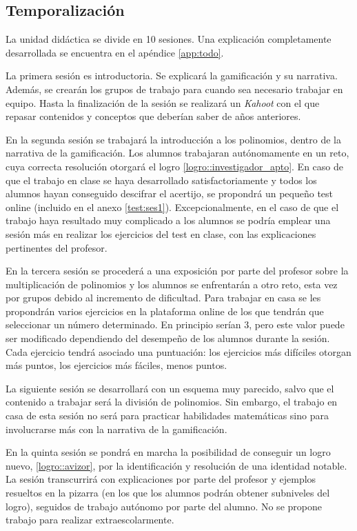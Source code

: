 \subsection{Temporalización}

La unidad didáctica se divide en 10 sesiones. 
%
Una explicación completamente desarrollada se encuentra en el apéndice \ref{app:todo}.


\label{ResumenSesion1}
%
La primera sesión es introductoria.
%
Se explicará la gamificación y su narrativa. 
%
Además, se crearán los grupos de trabajo para cuando sea necesario trabajar en equipo.
%
Hasta la finalización de la sesión se realizará un \textit{Kahoot} con el que repasar contenidos y conceptos que deberían saber de años anteriores.

\label{ResumenSesion2}
%
En la segunda sesión se trabajará la introducción a los polinomios, dentro de la narrativa de la gamificación. 
%
Los alumnos trabajaran autónomamente en un reto, cuya correcta resolución otorgará el logro \ref{logro::investigador_apto}.
%
En caso de que el trabajo en clase se haya desarrollado satisfactoriamente y todos los alumnos hayan conseguido descifrar el acertijo, se propondrá un pequeño test online (incluido en el anexo \ref{test:ses1}).
%
Excepcionalmente, en el caso de que el trabajo haya resultado muy complicado a los alumnos se podría emplear una sesión más en realizar los ejercicios del test en clase, con las explicaciones pertinentes del profesor.

\label{ResumenSesion3}
%
En la tercera sesión se procederá a una exposición por parte del profesor sobre la multiplicación de polinomios y los alumnos se enfrentarán a otro reto, esta vez por grupos debido al incremento de dificultad.
%
Para trabajar en casa se les propondrán varios ejercicios en la plataforma online de los que tendrán que seleccionar un número determinado. 
%
En principio serían 3, pero este valor puede ser modificado dependiendo del desempeño de los alumnos durante la sesión.
%
Cada ejercicio tendrá asociado una puntuación: los ejercicios más difíciles otorgan más puntos, los ejercicios más fáciles, menos puntos.

\label{ResumenSesion4}
%
La siguiente sesión se desarrollará con un esquema muy parecido, salvo que el contenido a trabajar será la división de polinomios.
%
Sin embargo, el trabajo en casa de esta sesión no será para practicar habilidades matemáticas sino para involucrarse más con la narrativa de la gamificación.

\label{ResumenSesion5}
%
En la quinta sesión se pondrá en marcha la posibilidad de conseguir un logro nuevo, \ref{logro::avizor}, por la identificación y resolución de una identidad notable.
%
La sesión transcurrirá con explicaciones por parte del profesor y ejemplos resueltos en la pizarra (en los que los alumnos podrán obtener subniveles del logro), seguidos de trabajo autónomo por parte del alumno.
%
No se propone trabajo para realizar extraescolarmente.

